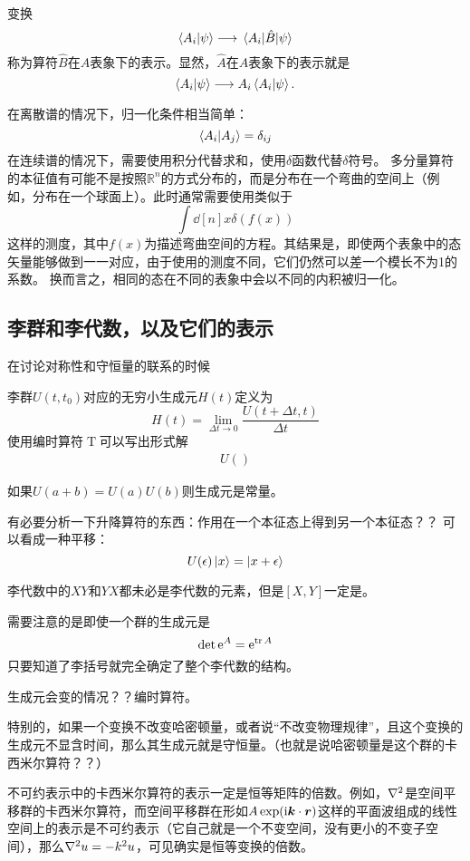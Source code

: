 \documentclass[UTF8, a4paper]{ctexart}
\DeclareMathOperator{\timeorder}{T}
\newcommand*{\ii}{\mathrm{i}}
\newcommand*{\ee}{\mathrm{e}}
\newcommand*{\reals}{\mathbb{R}}
\begin{document}
变换
\[
    \braket{A_i}{\psi} \longrightarrow \mel{A_i}{\hat{B}}{\psi}
\]
称为算符$\hat{B}$在$A$表象下的表示。显然，$\hat{A}$在$A$表象下的表示就是
\[
    \braket{A_i}{\psi} \longrightarrow A_i \braket{A_i}{\psi}.
\]

在离散谱的情况下，归一化条件相当简单：
\[
    \braket{A_i}{A_j} = \delta_{ij}
\]
在连续谱的情况下，需要使用积分代替求和，使用$\delta$函数代替$\delta$符号。
多分量算符的本征值有可能不是按照$\reals^n$的方式分布的，而是分布在一个弯曲的空间上（例如，分布在一个球面上）。此时通常需要使用类似于
\[
    \int \dd[n]{x} \delta(f(x))
\]
这样的测度，其中$f(x)$为描述弯曲空间的方程。其结果是，即使两个表象中的态矢量能够做到一一对应，由于使用的测度不同，它们仍然可以差一个模长不为1的系数。
换而言之，相同的态在不同的表象中会以不同的内积被归一化。

\subsection{李群和李代数，以及它们的表示}
在讨论对称性和守恒量的联系的时候

李群$U(t,t_0)$对应的无穷小生成元$H(t)$定义为
\begin{equation}
    H(t) = \lim_{\Delta t \to 0} \frac{U(t+\Delta t, t)}{\Delta t}
\end{equation}
使用编时算符$\timeorder$可以写出形式解
\begin{eqnarray}
    U()
\end{eqnarray}

如果$U(a+b)=U(a)U(b)$则生成元是常量。

有必要分析一下升降算符的东西：作用在一个本征态上得到另一个本征态？？
可以看成一种平移：
\[
    U(\epsilon) \ket{x} = \ket{x + \epsilon}
\]

李代数中的$XY$和$YX$都未必是李代数的元素，但是$[X,Y]$一定是。

需要注意的是即使一个群的生成元是
\[
    \det \ee^{A} = \ee^{\trace A}
\]
只要知道了李括号就完全确定了整个李代数的结构。

生成元会变的情况？？编时算符。

特别的，如果一个变换不改变哈密顿量，或者说“不改变物理规律”，且这个变换的生成元不显含时间，那么其生成元就是守恒量。（也就是说哈密顿量是这个群的卡西米尔算符？？）

不可约表示中的卡西米尔算符的表示一定是恒等矩阵的倍数。例如，$\laplacian$是空间平移群的卡西米尔算符，而空间平移群在形如$A\exp (\ii \vb*{k} \cdot \vb*{r})$这样的平面波组成的线性空间上的表示是不可约表示（它自己就是一个不变空间，没有更小的不变子空间），那么$\laplacian u = - k^2 u$，可见确实是恒等变换的倍数。
\end{document}
